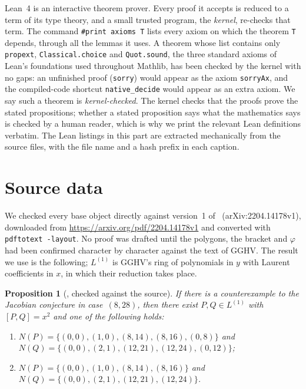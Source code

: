 \documentclass[a4paper,11pt]{article}
\theoremstyle{jsplain}
\newtheorem{proposition}[theorem]{Proposition}
\theoremstyle{jsdef}
\theoremstyle{jsrem}
\begin{document}
Lean~4 is an interactive theorem prover. Every proof it accepts is reduced to a term of its type theory, and a small trusted program, the \emph{kernel}, re-checks that term. The command \texttt{\#print axioms T} lists every axiom on which the theorem \texttt{T} depends, through all the lemmas it uses. A theorem whose list contains only \texttt{propext}, \texttt{Classical.\allowbreak{}choice} and \texttt{Quot.\allowbreak{}sound}, the three standard axioms of Lean's foundations used throughout Mathlib, has been checked by the kernel with no gaps: an unfinished proof (\texttt{sorry}) would appear as the axiom \texttt{sorryAx}, and the compiled-code shortcut \texttt{native\_\allowbreak{}decide} would appear as an extra axiom. We say such a theorem is \emph{kernel-checked}. The kernel checks that the proofs prove the stated propositions; whether a stated proposition says what the mathematics says is checked by a human reader, which is why we print the relevant Lean definitions verbatim. The Lean listings in this part are extracted mechanically from the source files, with the file name and a hash prefix in each caption.

\section{Source data}\label{ab:sec:source}

We checked every base object directly against version~1 of~\cite{GGHV} (arXiv:2204.14178v1), downloaded from \url{https://arxiv.org/pdf/2204.14178v1} and converted with \texttt{pdftotext -layout}. No proof was drafted until the polygons, the bracket and $\varphi$ had been confirmed character by character against the text of GGHV. The result we use is the following; $L^{(1)}$ is GGHV's ring of polynomials in $y$ with Laurent coefficients in $x$, in which their reduction takes place.

\begin{proposition}[{\cite[Proposition~4.3]{GGHV}, checked against the source}]\label{ab:prop:gghv43}
If there is a counterexample to the Jacobian conjecture in case~$(8,28)$, then there exist $P,Q\in L^{(1)}$ with $[P,Q]=x^2$ and one of the following holds:
\begin{enumerate}[nosep]
\item[(1)] $N(P)=\{(0,0),(1,0),(8,14),(8,16),(0,8)\}$ and\\ $N(Q)=\{(0,0),(2,1),(12,21),(12,24),(0,12)\}$;
\item[(2)] $N(P)=\{(0,0),(1,0),(8,14),(8,16)\}$ and $N(Q)=\{(0,0),(2,1),(12,21),(12,24)\}$.
\end{enumerate}
\end{proposition}
\end{document}
